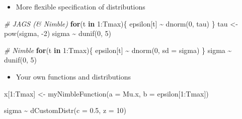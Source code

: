 \documentclass[
  12pt,
]{krantz}
\newenvironment{Shaded}{\begin{snugshade}}{\end{snugshade}}
\newcommand{\AttributeTok}[1]{\textcolor[rgb]{0.77,0.63,0.00}{#1}}
\newcommand{\CommentTok}[1]{\textcolor[rgb]{0.56,0.35,0.01}{\textit{#1}}}
\newcommand{\ControlFlowTok}[1]{\textcolor[rgb]{0.13,0.29,0.53}{\textbf{#1}}}
\newcommand{\DecValTok}[1]{\textcolor[rgb]{0.00,0.00,0.81}{#1}}
\newcommand{\FloatTok}[1]{\textcolor[rgb]{0.00,0.00,0.81}{#1}}
\newcommand{\FunctionTok}[1]{\textcolor[rgb]{0.00,0.00,0.00}{#1}}
\newcommand{\NormalTok}[1]{#1}
\newcommand{\OtherTok}[1]{\textcolor[rgb]{0.56,0.35,0.01}{#1}}
\newcommand{\SpecialCharTok}[1]{\textcolor[rgb]{0.00,0.00,0.00}{#1}}
\providecommand{\tightlist}{%
  \setlength{\itemsep}{0pt}\setlength{\parskip}{0pt}}
\begin{document}
\begin{itemize}
\tightlist
\item
  More flexible specification of distributions
\end{itemize}

\begin{Shaded}
\begin{Highlighting}[]
\CommentTok{\# JAGS (\& Nimble)}
\ControlFlowTok{for}\NormalTok{(t }\ControlFlowTok{in} \DecValTok{1}\SpecialCharTok{:}\NormalTok{Tmax)\{}
\NormalTok{  epsilon[t] }\SpecialCharTok{\textasciitilde{}} \FunctionTok{dnorm}\NormalTok{(}\DecValTok{0}\NormalTok{, tau)}
\NormalTok{\}}
\NormalTok{tau }\OtherTok{\textless{}{-}} \FunctionTok{pow}\NormalTok{(sigma, }\SpecialCharTok{{-}}\DecValTok{2}\NormalTok{)}
\NormalTok{sigma }\SpecialCharTok{\textasciitilde{}} \FunctionTok{dunif}\NormalTok{(}\DecValTok{0}\NormalTok{, }\DecValTok{5}\NormalTok{)}

\CommentTok{\# Nimble}
\ControlFlowTok{for}\NormalTok{(t }\ControlFlowTok{in} \DecValTok{1}\SpecialCharTok{:}\NormalTok{Tmax)\{}
\NormalTok{  epsilon[t] }\SpecialCharTok{\textasciitilde{}} \FunctionTok{dnorm}\NormalTok{(}\DecValTok{0}\NormalTok{, }\AttributeTok{sd =}\NormalTok{ sigma)}
\NormalTok{\}}
\NormalTok{sigma }\SpecialCharTok{\textasciitilde{}} \FunctionTok{dunif}\NormalTok{(}\DecValTok{0}\NormalTok{, }\DecValTok{5}\NormalTok{)}
\end{Highlighting}
\end{Shaded}

\begin{itemize}
\tightlist
\item
  Your own functions and distributions
\end{itemize}

\begin{Shaded}
\begin{Highlighting}[]
\NormalTok{x[}\DecValTok{1}\SpecialCharTok{:}\NormalTok{Tmax] }\OtherTok{\textless{}{-}} \FunctionTok{myNimbleFunction}\NormalTok{(}\AttributeTok{a =}\NormalTok{ Mu.x, }\AttributeTok{b =}\NormalTok{ epsilon[}\DecValTok{1}\SpecialCharTok{:}\NormalTok{Tmax])}
\end{Highlighting}
\end{Shaded}

\begin{Shaded}
\begin{Highlighting}[]
\NormalTok{sigma }\SpecialCharTok{\textasciitilde{}} \FunctionTok{dCustomDistr}\NormalTok{(}\AttributeTok{c =} \FloatTok{0.5}\NormalTok{, }\AttributeTok{z =} \DecValTok{10}\NormalTok{)}
\end{Highlighting}
\end{Shaded}
\end{document}
